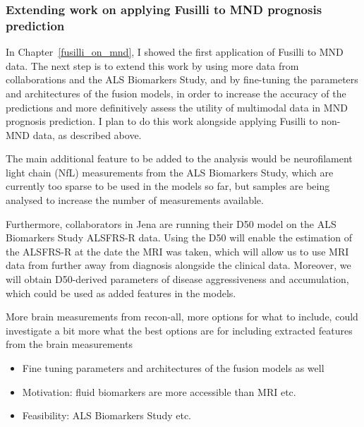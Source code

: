 \subsubsection*{Extending work on applying Fusilli to MND prognosis prediction}

In Chapter~\ref{fusilli_on_mnd}, I showed the first application of Fusilli to MND data.
The next step is to extend this work by using more data from collaborations and the ALS Biomarkers Study, and by fine-tuning the parameters and architectures of the fusion models, in order to increase the accuracy of the predictions and more definitively assess the utility of multimodal data in MND prognosis prediction.
I plan to do this work alongside applying Fusilli to non-MND data, as described above.

The main additional feature to be added to the analysis would be neurofilament light chain (NfL) measurements from the ALS Biomarkers Study, which are currently too sparse to be used in the models so far, but samples are being analysed to increase the number of measurements available.

Furthermore, collaborators in Jena are running their D50 model on the ALS Biomarkers Study ALSFRS-R data.
Using the D50 will enable the estimation of the ALSFRS-R at the date the MRI was taken, which will allow us to use MRI data from further away from diagnosis alongside the clinical data.
Moreover, we will obtain D50-derived parameters of disease aggressiveness and accumulation, which could be used as added features in the models.

More brain measurements from recon-all, more options for what to include, could investigate a bit more what the best options are for including extracted features from the brain measurements

\begin{itemize}
    \item Fine tuning parameters and architectures of the fusion models as well
    \item Motivation: fluid biomarkers are more accessible than MRI etc.
    \item Feasibility: ALS Biomarkers Study etc.
\end{itemize}

